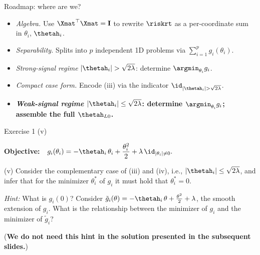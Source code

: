 \documentclass[aspectratio=169]{beamer}
\newcommand{\thetahi}{\thetah_i}
\newcommand{\thetai}{\theta_i}
\newcommand{\Imat}{\mathbf{I}}
\begin{document}
\begin{frame}{Roadmap: where are we?}
	\small
	\begin{itemize}\setlength{\itemsep}{6pt}\setlength{\parskip}{0pt}
		\item[\textcolor{black!55}{$\checkmark$\,\textbf{(i)}}] \textcolor{black!55}{\textit{Algebra.} Use $\Xmat^\top\Xmat = \Imat$ to rewrite $\riskrt$ as a per-coordinate sum in $\thetai$, $\thetahi$.}
		\item[\textcolor{black!55}{$\checkmark$\,\textbf{(ii)}}] \textcolor{black!55}{\textit{Separability.} Splits into $p$ independent 1D problems via $\sum_{i=1}^p g_i(\thetai)$.}
		\item[\textcolor{black!55}{$\checkmark$\,\textbf{(iii)}}] \textcolor{black!55}{\textit{Strong-signal regime} $|\thetahi| > \sqrt{2\lambda}$: determine $\argmin_{\thetai} g_i$.}
		\item[\textcolor{black!55}{$\checkmark$\,\textbf{(iv)}}] \textcolor{black!55}{\textit{Compact case form.} Encode (iii) via the indicator $\id_{|\thetahi|>\sqrt{2\lambda}}$.}
		\item[\structure{$\blacktriangleright$\,\textbf{(v)}}] \textbf{\textit{Weak-signal regime} $|\thetahi| \leq \sqrt{2\lambda}$: determine $\argmin_{\thetai} g_i$; assemble the full $\thetah_{L0}$.}
	\end{itemize}
\end{frame}

\begin{frame}{Exercise 1 (v)}
	\begin{center}
	{\setlength{\fboxsep}{6pt}\colorbox{black!8}{\parbox{0.92\textwidth}{
		\centering\footnotesize
		\textbf{Objective:}\ \ $g_i(\thetai) = -\thetahi\,\thetai + \dfrac{\thetai^2}{2} + \lambda\,\id_{|\thetai|\neq 0}.$
	}}}
	\end{center}

	\smallskip
	(v) Consider the complementary case of (iii) and (iv), i.e., $|\thetahi| \leq \sqrt{2\lambda}$, and infer that for the minimizer $\thetai^*$ of $g_i$ it must hold that $\thetai^* = 0$.

	\bigskip
	\emph{Hint:} What is $g_i(0)$? Consider $\tilde{g}_i(\theta) = -\thetahi\,\theta + \frac{\theta^2}{2} + \lambda$, the smooth extension of $g_i$. What is the relationship between the minimizer of $g_i$ and the minimizer of $\tilde{g}_i$?

	{\small (\textbf{We do not need this hint in the solution presented in the subsequent slides.})}
\end{frame}
\end{document}
